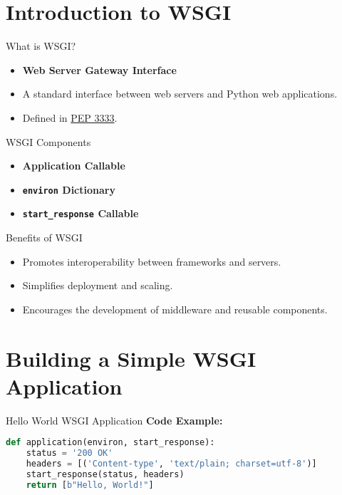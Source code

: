 \documentclass{beamer}
\begin{document}
\section{Introduction to WSGI}

\begin{frame}{What is WSGI?}
    \begin{itemize}
        \item \textbf{Web Server Gateway Interface}
        \item A standard interface between web servers and Python web applications.
        \item Defined in \href{https://www.python.org/dev/peps/pep-3333/}{PEP 3333}.
    \end{itemize}
\end{frame}

\begin{frame}{WSGI Components}
    \begin{itemize}
        \item \textbf{Application Callable}
        \item \textbf{\texttt{environ} Dictionary}
        \item \textbf{\texttt{start\_response} Callable}
    \end{itemize}
\end{frame}

\begin{frame}{Benefits of WSGI}
    \begin{itemize}
        \item Promotes interoperability between frameworks and servers.
        \item Simplifies deployment and scaling.
        \item Encourages the development of middleware and reusable components.
    \end{itemize}
\end{frame}

\section{Building a Simple WSGI Application}

\begin{frame}[fragile]{Hello World WSGI Application}
    \textbf{Code Example:}
    \begin{lstlisting}[language=Python]
def application(environ, start_response):
    status = '200 OK'
    headers = [('Content-type', 'text/plain; charset=utf-8')]
    start_response(status, headers)
    return [b"Hello, World!"]
    \end{lstlisting}
\end{frame}
\end{document}
